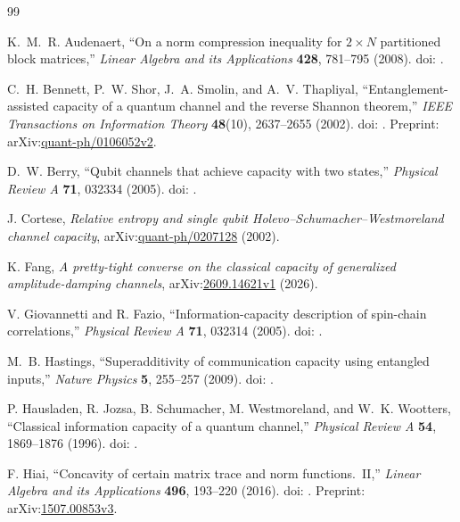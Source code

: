 \begin{thebibliography}{99}

K.~M.~R. Audenaert,
``On a norm compression inequality for $2\times N$ partitioned block matrices,''
\emph{Linear Algebra and its Applications} \textbf{428}, 781--795 (2008).
doi: .

C.~H. Bennett, P.~W. Shor, J.~A. Smolin, and A.~V. Thapliyal,
``Entanglement-assisted capacity of a quantum channel and the reverse Shannon theorem,''
\emph{IEEE Transactions on Information Theory} \textbf{48}(10),
2637--2655 (2002).
doi: .
Preprint: arXiv:\href{https://arxiv.org/abs/quant-ph/0106052v2}{quant-ph/0106052v2}.

D.~W. Berry,
``Qubit channels that achieve capacity with two states,''
\emph{Physical Review A} \textbf{71}, 032334 (2005).
doi: .

J. Cortese,
\emph{Relative entropy and single qubit Holevo--Schumacher--Westmoreland channel capacity},
arXiv:\href{https://arxiv.org/abs/quant-ph/0207128}{quant-ph/0207128} (2002).

K. Fang,
\emph{A pretty-tight converse on the classical capacity of generalized amplitude-damping channels},
arXiv:\href{https://arxiv.org/abs/2609.14621v1}{2609.14621v1} (2026).

V. Giovannetti and R. Fazio,
``Information-capacity description of spin-chain correlations,''
\emph{Physical Review A} \textbf{71}, 032314 (2005).
doi: .

M.~B. Hastings,
``Superadditivity of communication capacity using entangled inputs,''
\emph{Nature Physics} \textbf{5}, 255--257 (2009).
doi: .

P. Hausladen, R. Jozsa, B. Schumacher, M. Westmoreland, and W.~K. Wootters,
``Classical information capacity of a quantum channel,''
\emph{Physical Review A} \textbf{54}, 1869--1876 (1996).
doi: .

F. Hiai,
``Concavity of certain matrix trace and norm functions.~II,''
\emph{Linear Algebra and its Applications} \textbf{496}, 193--220 (2016).
doi: .
Preprint: arXiv:\href{https://arxiv.org/abs/1507.00853v3}{1507.00853v3}.


\end{thebibliography}
